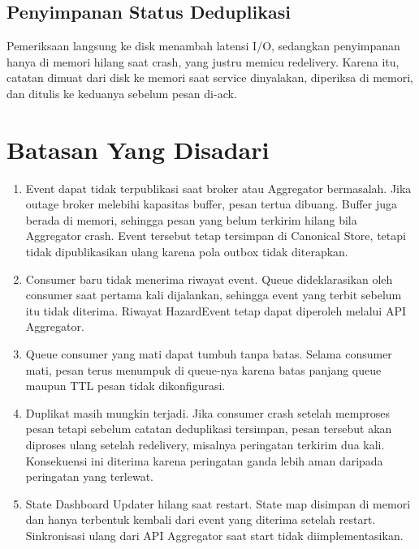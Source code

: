 \subsection{Penyimpanan Status Deduplikasi}

Pemeriksaan langsung ke disk menambah latensi I/O, sedangkan penyimpanan hanya di memori hilang saat crash, yang justru memicu redelivery. Karena itu, catatan dimuat dari disk ke memori saat service dinyalakan, diperiksa di memori, dan ditulis ke keduanya sebelum pesan di-ack.

\section{Batasan Yang Disadari}

\begin{enumerate}
\def\labelenumi{\arabic{enumi}.}
\tightlist
\item
  Event dapat tidak terpublikasi saat broker atau Aggregator bermasalah. Jika outage broker melebihi kapasitas buffer, pesan tertua dibuang. Buffer juga berada di memori, sehingga pesan yang belum terkirim hilang bila Aggregator crash. Event tersebut tetap tersimpan di Canonical Store, tetapi tidak dipublikasikan ulang karena pola outbox tidak diterapkan.\\
\item
  Consumer baru tidak menerima riwayat event. Queue dideklarasikan oleh consumer saat pertama kali dijalankan, sehingga event yang terbit sebelum itu tidak diterima. Riwayat HazardEvent tetap dapat diperoleh melalui API Aggregator.\\
\item
  Queue consumer yang mati dapat tumbuh tanpa batas. Selama consumer mati, pesan terus menumpuk di queue-nya karena batas panjang queue maupun TTL pesan tidak dikonfigurasi.\\
\item
  Duplikat masih mungkin terjadi. Jika consumer crash setelah memproses pesan tetapi sebelum catatan deduplikasi tersimpan, pesan tersebut akan diproses ulang setelah redelivery, misalnya peringatan terkirim dua kali. Konsekuensi ini diterima karena peringatan ganda lebih aman daripada peringatan yang terlewat.\\
\item
  State Dashboard Updater hilang saat restart. State map disimpan di memori dan hanya terbentuk kembali dari event yang diterima setelah restart. Sinkronisasi ulang dari API Aggregator saat start tidak diimplementasikan.\\

\end{enumerate}
